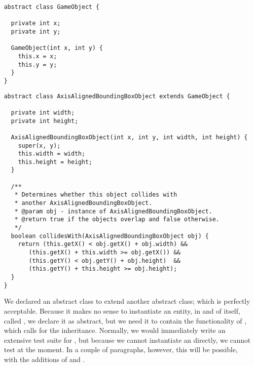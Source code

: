 \begin{lstlisting}[language=MyJava]
abstract class GameObject {
  
  private int x;
  private int y;

  GameObject(int x, int y) {
    this.x = x;
    this.y = y;
  }
}
\end{lstlisting}


\begin{lstlisting}[language=Myjava]
abstract class AxisAlignedBoundingBoxObject extends GameObject {
  
  private int width;
  private int height;

  AxisAlignedBoundingBoxObject(int x, int y, int width, int height) {
    super(x, y);
    this.width = width;
    this.height = height;
  }

  /**
   * Determines whether this object collides with 
   * another AxisAlignedBoundingBoxObject.
   * @param obj - instance of AxisAlignedBoundingBoxObject.
   * @return true if the objects overlap and false otherwise.
   */
  boolean collidesWith(AxisAlignedBoundingBoxObject obj) {
    return (this.getX() < obj.getX() + obj.width) &&
	   (this.getX() + this.width >= obj.getX()) &&
 	   (this.getY() < obj.getY() + obj.height)  &&
	   (this.getY() + this.height >= obj.height); 
  }
}
\end{lstlisting}

We declared an abstract class to extend another abstract class; which is perfectly acceptable. Because it makes no sense to instantiate an entity, in and of itself, called , we declare it as abstract, but we need it to contain the functionality of , which calls for the inheritance. Normally, we would immediately write an extensive test suite for , but because we cannot instantiate an  directly, we cannot test  at the moment. In a couple of paragraphs, however, this will be possible, with the additions of  and .

